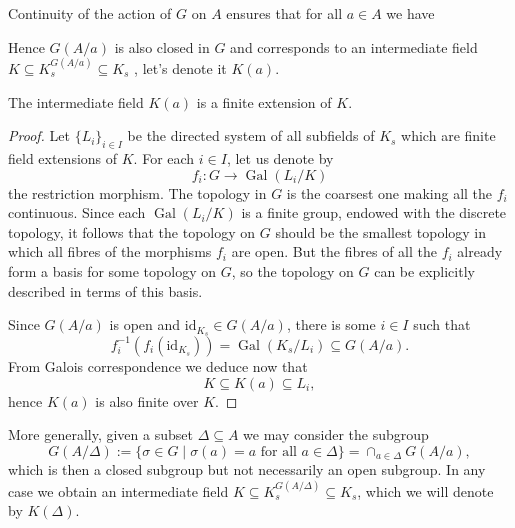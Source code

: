 \documentclass[12pt]{amsart}
\DeclareMathOperator{\Gal}{Gal}
\newcommand{\id}{\mathrm{id}}
\begin{document}
Continuity of the action of $G$ on $A$ ensures that for all $a\in A$ we have
\begin{center}
\end{center}
Hence $G(A/a)$ is also closed in $G$ and corresponds to an intermediate field $K\subseteq K_{s}^{G(A/a)}\subseteq K_{s}$ \cite[4.2/3]{bos18}, let's denote it $K(a)$.

\begin{lm}\label{lm:intermediate}
    The intermediate field $K(a)$ is a finite extension of $K$.
    \begin{proof}
	Let $\{ L_{i} \}_{i\in I}$ be the directed system of all subfields of $K_{s}$ which are finite field extensions of $K$.
	For each $i\in I$, let us denote by
	\[ f_{i}\colon G\to \Gal(L_{i}/K) \]
	the restriction morphism.
	The topology in $G$ is the coarsest one making all the $f_{i}$ continuous.
	Since each $\Gal(L_{i}/K)$ is a finite group, endowed with the discrete topology, it follows that the topology on $G$ should be the smallest topology in which all fibres of the morphisms $f_{i}$ are open.
	But the fibres of all the $f_{i}$ already form a basis for some topology on $G$, so the topology on $G$ can be explicitly described in terms of this basis.

	Since $G(A/a)$ is open and $\id_{K_{s}}\in G(A/a)$, there is some $i\in I$ such that
	\[ f_{i}^{-1}(f_{i}(\id_{K_{s}}))=\Gal(K_{s}/L_{i})\subseteq G(A/a). \]
	From Galois correspondence we deduce now that
	\[ K\subseteq K(a)\subseteq L_{i}, \]
	hence $K(a)$ is also finite over $K$.
    \end{proof}
\end{lm}

More generally, given a subset $\Delta\subseteq A$ we may consider the subgroup
\[ G(A/\Delta):=\{\sigma\in G\mid \sigma(a)=a \text{ for all }a\in \Delta\}=\cap_{a\in \Delta}G(A/a), \]
which is then a closed subgroup but not necessarily an open subgroup.
In any case we obtain an intermediate field $K\subseteq K_{s}^{G(A/\Delta)}\subseteq K_{s}$, which we will denote by $K(\Delta)$.
\end{document}
